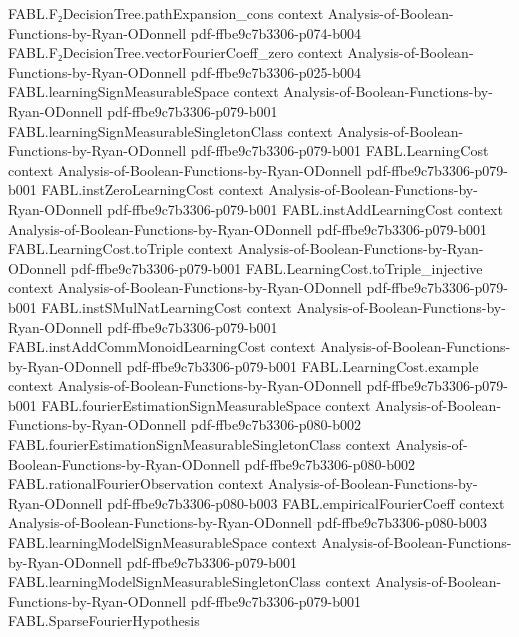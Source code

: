 \begin{theorem}
\proofstep
  {FABL.F₂DecisionTree.pathExpansion_cons}
  {context}
  {Analysis-of-Boolean-Functions-by-Ryan-ODonnell}
  {pdf-ffbe9c7b3306-p074-b004}
\proofstep
  {FABL.F₂DecisionTree.vectorFourierCoeff_zero}
  {context}
  {Analysis-of-Boolean-Functions-by-Ryan-ODonnell}
  {pdf-ffbe9c7b3306-p025-b004}
\proofstep
  {FABL.learningSignMeasurableSpace}
  {context}
  {Analysis-of-Boolean-Functions-by-Ryan-ODonnell}
  {pdf-ffbe9c7b3306-p079-b001}
\proofstep
  {FABL.learningSignMeasurableSingletonClass}
  {context}
  {Analysis-of-Boolean-Functions-by-Ryan-ODonnell}
  {pdf-ffbe9c7b3306-p079-b001}
\proofstep
  {FABL.LearningCost}
  {context}
  {Analysis-of-Boolean-Functions-by-Ryan-ODonnell}
  {pdf-ffbe9c7b3306-p079-b001}
\proofstep
  {FABL.instZeroLearningCost}
  {context}
  {Analysis-of-Boolean-Functions-by-Ryan-ODonnell}
  {pdf-ffbe9c7b3306-p079-b001}
\proofstep
  {FABL.instAddLearningCost}
  {context}
  {Analysis-of-Boolean-Functions-by-Ryan-ODonnell}
  {pdf-ffbe9c7b3306-p079-b001}
\proofstep
  {FABL.LearningCost.toTriple}
  {context}
  {Analysis-of-Boolean-Functions-by-Ryan-ODonnell}
  {pdf-ffbe9c7b3306-p079-b001}
\proofstep
  {FABL.LearningCost.toTriple_injective}
  {context}
  {Analysis-of-Boolean-Functions-by-Ryan-ODonnell}
  {pdf-ffbe9c7b3306-p079-b001}
\proofstep
  {FABL.instSMulNatLearningCost}
  {context}
  {Analysis-of-Boolean-Functions-by-Ryan-ODonnell}
  {pdf-ffbe9c7b3306-p079-b001}
\proofstep
  {FABL.instAddCommMonoidLearningCost}
  {context}
  {Analysis-of-Boolean-Functions-by-Ryan-ODonnell}
  {pdf-ffbe9c7b3306-p079-b001}
\proofstep
  {FABL.LearningCost.example}
  {context}
  {Analysis-of-Boolean-Functions-by-Ryan-ODonnell}
  {pdf-ffbe9c7b3306-p079-b001}
\proofstep
  {FABL.fourierEstimationSignMeasurableSpace}
  {context}
  {Analysis-of-Boolean-Functions-by-Ryan-ODonnell}
  {pdf-ffbe9c7b3306-p080-b002}
\proofstep
  {FABL.fourierEstimationSignMeasurableSingletonClass}
  {context}
  {Analysis-of-Boolean-Functions-by-Ryan-ODonnell}
  {pdf-ffbe9c7b3306-p080-b002}
\proofstep
  {FABL.rationalFourierObservation}
  {context}
  {Analysis-of-Boolean-Functions-by-Ryan-ODonnell}
  {pdf-ffbe9c7b3306-p080-b003}
\proofstep
  {FABL.empiricalFourierCoeff}
  {context}
  {Analysis-of-Boolean-Functions-by-Ryan-ODonnell}
  {pdf-ffbe9c7b3306-p080-b003}
\proofstep
  {FABL.learningModelSignMeasurableSpace}
  {context}
  {Analysis-of-Boolean-Functions-by-Ryan-ODonnell}
  {pdf-ffbe9c7b3306-p079-b001}
\proofstep
  {FABL.learningModelSignMeasurableSingletonClass}
  {context}
  {Analysis-of-Boolean-Functions-by-Ryan-ODonnell}
  {pdf-ffbe9c7b3306-p079-b001}
\proofstep
  {FABL.SparseFourierHypothesis}

\end{theorem}
